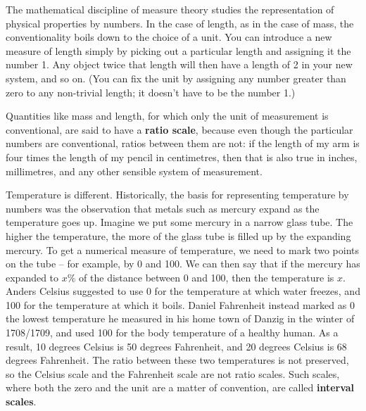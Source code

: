 The mathematical discipline of measure theory studies the
representation of physical properties by numbers. In the case of
length, as in the case of mass, the conventionality boils down to the
choice of a unit. You can introduce a new measure of length simply by
picking out a particular length and assigning it the number 1. Any
object twice that length will then have a length of 2 in your new
system, and so on. (You can fix the unit by assigning any number
greater than zero to any non-trivial length; it doesn't have to be the
number 1.)

Quantities like mass and length, for which only the unit of
measurement is conventional, are said to have a \textbf{ratio scale},
because even though the particular numbers are conventional, ratios
between them are not: if the length of my arm is four times the length
of my pencil in centimetres, then that is also true in inches,
millimetres, and any other sensible system of measurement.

Temperature is different. Historically, the basis for representing temperature
by numbers was the observation that metals such as mercury expand as the
temperature goes up. Imagine we put some mercury in a narrow glass tube. The
higher the temperature, the more of the glass tube is filled up by the expanding
mercury. To get a numerical measure of temperature, we need to mark two points
on the tube -- for example, by 0 and 100. We can then say that if the mercury
has expanded to $x\%$ of the distance between 0 and 100, then the temperature is
$x$. Anders Celsius suggested to use 0 for the temperature at which water
freezes, and 100 for the temperature at which it boils. Daniel Fahrenheit
instead marked as 0 the lowest temperature he measured in his home town of
Danzig in the winter of 1708/1709, and used 100 for the body temperature of a
healthy human. As a result, 10 degrees Celsius is 50 degrees Fahrenheit, and 20
degrees Celsius is 68 degrees Fahrenheit. The ratio between these two
temperatures is not preserved, so the Celsius scale and the Fahrenheit scale are
not ratio scales.%
Such scales, where both the zero and the unit are a matter of convention, are
called \textbf{interval scales}.


